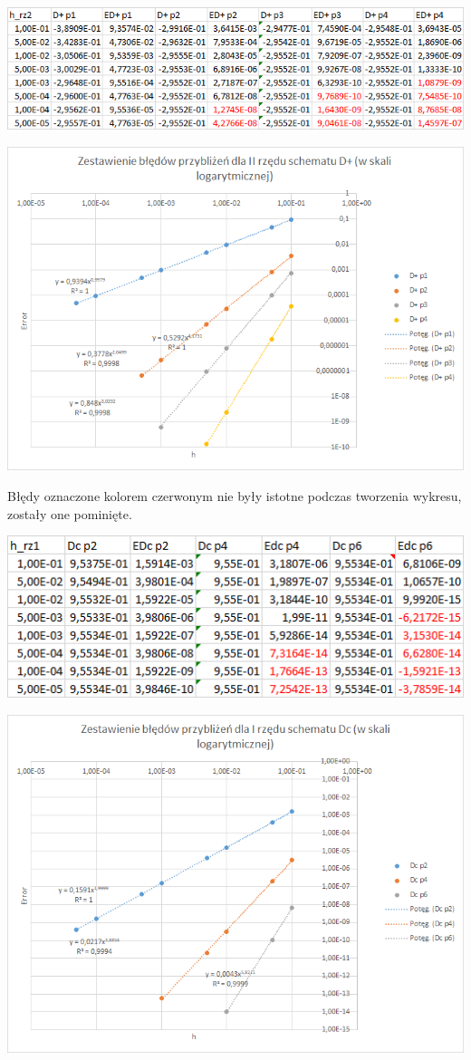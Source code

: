 \includegraphics{Lab2/charts/rz2_log_Df_dane.png}

\includegraphics{Lab2/charts/rz2_log_Df.png}
\newpage

Błędy oznaczone kolorem czerwonym nie były istotne podczas tworzenia wykresu, zostały one pominięte.

\includegraphics{Lab2/charts/rz1_log_Dc_dane.png}

\includegraphics{Lab2/charts/rz1_log_Dc.png}
\newpage

